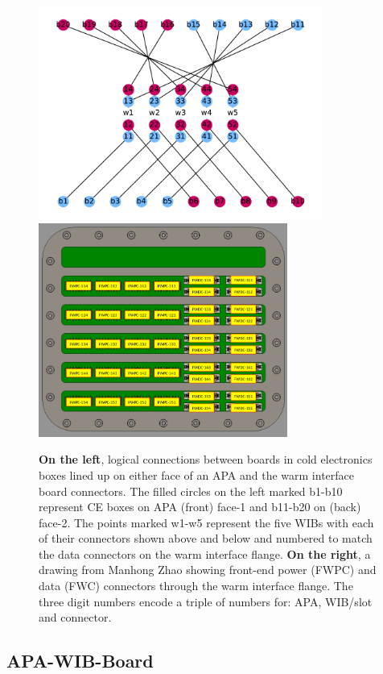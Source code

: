 \documentclass[pdftex,12pt,letter]{article}
\begin{document}
\begin{figure}[h]
  \centering
  \includegraphics[height=7cm]{test_plot_wib.pdf}%
  \includegraphics[height=7cm]{others/manhong-ce-mapping-wib.png}

  \caption{\textbf{On the left}, logical connections between boards in
    cold electronics boxes lined up on either face of an APA and the
    warm interface board connectors.  The filled circles on the left
    marked b1-b10 represent CE boxes on APA (front) face-1 and b11-b20
    on (back) face-2.  The points marked w1-w5 represent the five WIBs
    with each of their connectors shown above and below and numbered
    to match the data connectors on the warm interface flange.
    \textbf{On the right}, a drawing from Manhong Zhao showing
    front-end power (FWPC) and data (FWC) connectors through the warm
    interface flange.  The three digit numbers encode a triple of
    numbers for: APA, WIB/slot and connector.}
  \label{fig:wibflange}
\end{figure}

\subsection{APA-WIB-Board}
\end{document}
